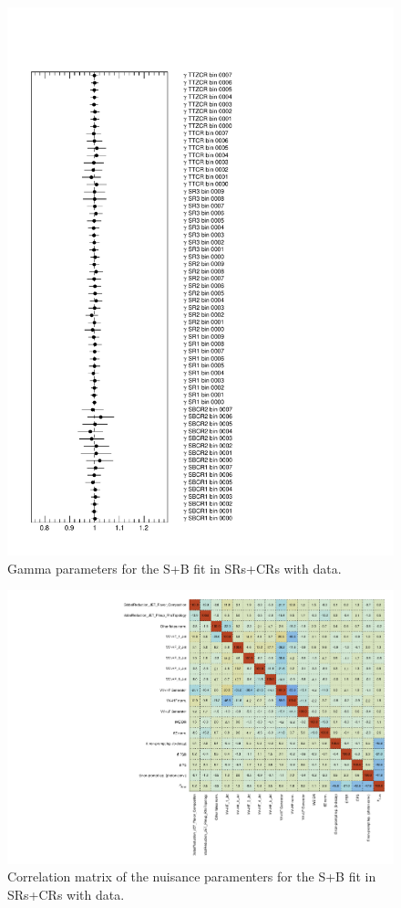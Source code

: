 \begin{figure}[htbp]
	\centering
	\includegraphics[width=.85\textwidth]{Chapters/CH8/figures/SPLUSB_CRSR_DL1rc_unblind/Gammas}
	\caption{Gamma parameters for the S+B \tZc fit in SRs+CRs with data.}%
	\label{fig:stat:tzc:splusb:crsr:gamma_unb}
\end{figure}

\begin{figure}[htbp]
	\centering
	\includegraphics[width=.95\textwidth]{Chapters/CH8/figures/SPLUSB_CRSR_DL1rc_unblind/CorrMatrix}
	\caption{Correlation matrix of the nuisance paramenters for the S+B \tZc fit in SRs+CRs with data.}%
	\label{fig:stat:tzc:splusb:crsr:corrmatrix_unb}
\end{figure}

